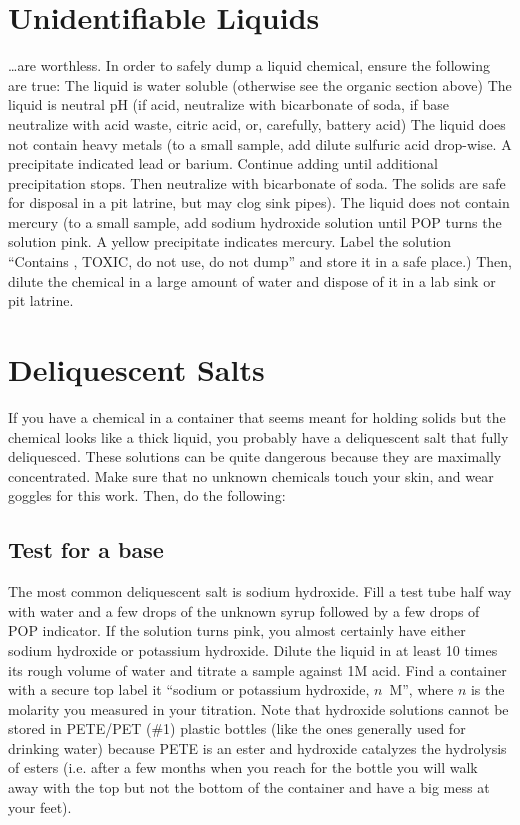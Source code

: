 \section{Unidentifiable Liquids}

\ldots are worthless. 
In order to safely dump a liquid chemical, 
ensure the following are true:
The liquid is water soluble (otherwise see the organic section above)
The liquid is neutral pH (if acid, 
neutralize with bicarbonate of soda, 
if base neutralize with acid waste, 
citric acid, 
or, 
carefully, 
battery acid)
The liquid does not contain heavy metals (to a small sample, 
add dilute sulfuric acid drop-wise. 
A precipitate indicated lead or barium. 
Continue adding until additional precipitation stops. 
Then neutralize with bicarbonate of soda. 
The solids are safe for disposal in a pit latrine, 
but may clog sink pipes).
The liquid does not contain mercury (to a small sample, 
add sodium hydroxide solution until POP turns the solution pink. 
A yellow precipitate indicates mercury. 
Label the solution ``Contains , 
TOXIC, 
do not use, 
do not dump'' and store it in a safe place.)
Then, 
dilute the chemical in a large amount of water 
and dispose of it in a lab sink or pit latrine.

\section{Deliquescent Salts}

If you have a chemical in a container that seems meant 
for holding solids but the chemical looks like a thick liquid, 
you probably have a deliquescent salt that fully deliquesced. 
These solutions can be quite dangerous 
because they are maximally concentrated. 
Make sure that no unknown chemicals touch your skin, 
and wear goggles for this work. 
Then, 
do the following:

\subsection{Test for a base}
The most common deliquescent salt is sodium hydroxide. 
Fill a test tube half way with water 
and a few drops of the unknown syrup 
followed by a few drops of POP indicator. 
If the solution turns pink, 
you almost certainly have either 
sodium hydroxide or potassium hydroxide. 
Dilute the liquid in at least 10 times its 
rough volume of water and titrate a sample against 1M acid. 
Find a container with a secure top  
label it ``sodium or potassium hydroxide, 
$n$~M'', 
where $n$ is the molarity you measured in your titration. 
Note that hydroxide solutions cannot be stored in PETE/PET (\#1) plastic bottles 
(like the ones generally used for drinking water) 
because PETE is an ester and hydroxide catalyzes the hydrolysis of esters 
(i.e. after a few months when you reach for the bottle 
you will walk away with the top 
but not the bottom of the container 
and have a big mess at your feet).

